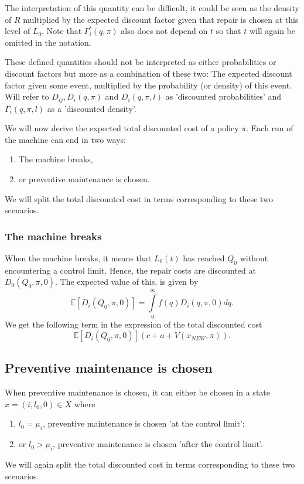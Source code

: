The interpretation of this quantity can be difficult, it could be seen as the density of $R$ multiplied by the expected discount factor given that repair is chosen at this level of $L_0$.
Note that $\Gamma_i^t(q,\pi)$ also does not depend on $t$ so that $t$ will again be omitted in the notation.
\begin{remark}
	These defined quantities should not be interpreted as either probabilities or discount factors but more as a combination of these two: The expected discount factor given some event, multiplied by the probability (or density) of this event.
	Will refer to $D_{ij},D_{i}(q,\pi)$ and $D_{i}(q,\pi,l)$ as 'discounted probabilities' and $\Gamma_i(q,\pi,l)$ as a 'discounted density'.
\end{remark}
We will now derive the expected total discounted cost of a policy $\pi$.
Each run of the machine can end in two ways:
\begin{enumerate}
	\item The machine breaks,
	\item or preventive maintenance is chosen.
\end{enumerate}
We will split the total discounted cost in terms corresponding to these two scenarios.

\subsubsection{The machine breaks}
When the machine breaks, it means that $L_0(t)$ has reached $Q_0$ without encountering a control limit.
Hence, the repair costs are discounted at $D_0(Q_0,\pi,0)$.
The expected value of this, is given by
\[
\mathbb{E}[D_{i}(Q_0,\pi,0)]=\int\limits_0^\infty f(q)D_{i}(q,\pi,0)dq.
\]
We get the following term in the expression of the total discounted cost
\[
\mathbb{E}[D_{i}(Q_0,\pi,0)](c+a+V(x_{NEW},\pi)).
\]

\subsection{Preventive maintenance is chosen}
When preventive maintenance is chosen, it can either be chosen in a state $x=(i,l_0,0)\in X$ where
\begin{enumerate}
	\item $l_0=\mu_i$, preventive maintenance is chosen 'at the control limit';
	\item or $l_0>\mu_i$, preventive maintenance is chosen 'after the control limit'.
\end{enumerate}
We will again split the total discounted cost in terms corresponding to these two scenarios.

